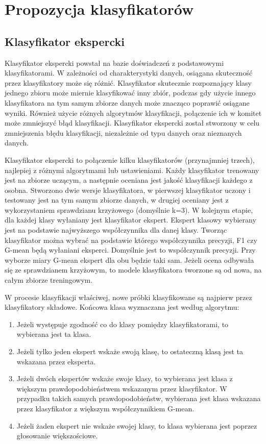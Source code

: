 \chapter{Propozycja klasyfikatorów}
\section{Klasyfikator ekspercki}
Klasyfikator ekspercki powstał na bazie doświadczeń z podstawowymi klasyfikatorami. W zależności od charakterystyki danych, osiągana skuteczność przez klasyfikatory może się różnić. Klasyfikator skutecznie rozpoznający klasy jednego zbioru może miernie klasyfikować inny zbiór, podczas gdy użycie innego klasyfikatora na tym samym zbiorze danych może znacząco poprawić osiągane wyniki. Również użycie różnych algorytmów klasyfikacji, połączenie ich w komitet może zmniejszyć błąd klasyfikacji. 
Klasyfikator ekspercki został stworzony w celu zmniejszenia błędu klasyfikacji, niezależnie od typu danych oraz nieznanych danych. \par
Klasyfikator ekspercki to połączenie kilku klasyfikatorów (przynajmniej trzech), najlepiej z różnymi algorytmami lub ustawieniami. Każdy klasyfikator trenowany jest na zbiorze uczącym, a następnie oceniana jest jakość klasyfikacji każdego z osobna. Stworzono dwie wersje klasyfikatora, w pierwszej klasyfikator uczony i testowany jest na tym samym zbiorze danych, w drugiej oceniany jest z wykorzystaniem sprawdzianu krzyżowego (domyślnie k=3). W kolejnym etapie, dla każdej klasy wyłaniany jest klasyfikator ekspert. Ekspert klasowy wybierany jest na podstawie najwyższego współczynnika dla danej klasy. Tworząc klasyfikator można wybrać na podstawie którego współczynnika precyzji, F1 czy G-mean będą wyłaniani eksperci. Domyślnie jest to współczynnik precyzji. Przy wyborze miary G-mean ekspert dla obu będzie taki sam. Jeżeli ocena odbywała się ze sprawdzianem krzyżowym, to modele klasyfikatora tworzone są od nowa, na całym zbiorze treningowym. \par
W procesie klasyfikacji właściwej, nowe próbki klasyfikowane są najpierw przez klasyfikatory składowe. Końcowa klasa wyznaczana jest według algorytmu:
\begin{enumerate}
	\item Jeżeli występuje zgodność co do klasy pomiędzy klasyfikatorami, to wybierana jest ta klasa.
	\item Jeżeli tylko jeden ekspert wskaże swoją klasę, to ostateczną klasą jest ta wskazana przez eksperta.
	\item Jeżeli dwóch ekspertów wskaże swoje klasy, to wybierana jest klasa z większym prawdopodobieństwem wskazanym przez klasyfikator. W przypadku takich samych prawdopodobieństw, wybierana jest klasa wskazana przez klasyfikator z większym współczynnikiem G-mean.
	\item Jeżeli żaden ekspert nie wskaże swojej klasy, to klasa wybierana jest poprzez głosowanie większościowe.
\end{enumerate}
